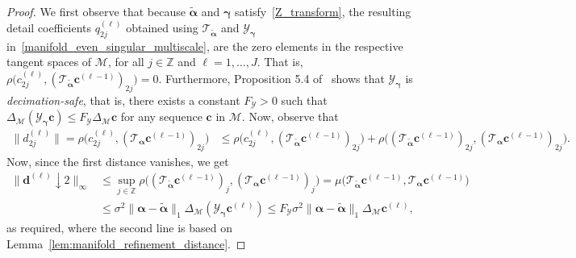 \documentclass[12pt]{article}
\begin{document}
\begin{proof}
    We first observe that because $\widetilde{\boldsymbol{\alpha}}$ and $\boldsymbol{\gamma}$ satisfy~\eqref{Z_transform}, the resulting detail coefficients $q^{(\ell)}_{2j}$ obtained using $\mathcal{T}_{\widetilde{\boldsymbol{\alpha}}}$ and $\mathcal{Y}_{\boldsymbol{\gamma}}$ in~\eqref{manifold_even_singular_multiscale}, are the zero elements in the respective tangent spaces of $\mathcal{M}$, for all $j\in\mathbb{Z}$ and $\ell=1,\dots,J$. That is, $\rho\big(c^{(\ell)}_{2j}, (\mathcal{T}_{\widetilde{\boldsymbol{\alpha}}}\boldsymbol{c}^{(\ell-1)})_{2j}\big)=0$. Furthermore, Proposition 5.4 of~\cite{mattar2023pyramid} shows that $\mathcal{Y}_{\boldsymbol{\gamma}}$ is \emph{decimation-safe}, that is, there exists a constant $F_{\mathcal{Y}}>0$ such that $\Delta_{\mathcal{M}}(\mathcal{Y}_{\boldsymbol{\gamma}}\boldsymbol{c})\leq F_{\mathcal{Y}}\Delta_{\mathcal{M}}\boldsymbol{c}$ for any sequence $\boldsymbol{c}$ in $\mathcal{M}$. Now, observe that
    \begin{align*}
        \|d^{(\ell)}_{2j}\| = \rho\big(c^{(\ell)}_{2j}, (\mathcal{T}_{\boldsymbol{\alpha}}\boldsymbol{c}^{(\ell-1)})_{2j}\big) & \leq \rho\big(c^{(\ell)}_{2j}, (\mathcal{T}_{\widetilde{\boldsymbol{\alpha}}}\boldsymbol{c}^{(\ell-1)})_{2j}\big) + \rho\big((\mathcal{T}_{\widetilde{\boldsymbol{\alpha}}}\boldsymbol{c}^{(\ell-1)})_{2j}, (\mathcal{T}_{\boldsymbol{\alpha}}\boldsymbol{c}^{(\ell-1)})_{2j}\big).
    \end{align*}
    Now, since the first distance vanishes, we get
    \begin{align*}
        \|\boldsymbol{d}^{(\ell)}\downarrow2\|_\infty &\leq \sup_{j\in\mathbb{Z}}\rho\big((\mathcal{T}_{\widetilde{\boldsymbol{\alpha}}}\boldsymbol{c}^{(\ell-1)})_{j}, (\mathcal{T}_{\boldsymbol{\alpha}}\boldsymbol{c}^{(\ell-1)})_{j}\big) = \mu\big(\mathcal{T}_{\widetilde{\boldsymbol{\alpha}}}\boldsymbol{c}^{(\ell-1)}, \mathcal{T}_{\boldsymbol{\alpha}}\boldsymbol{c}^{(\ell-1)}\big) \\
        & \leq \sigma^2\|\boldsymbol{\alpha} - \widetilde{\boldsymbol{\alpha}}\|_1\Delta_{\mathcal{M}}(\mathcal{Y}_{\boldsymbol{\gamma}}\boldsymbol{c}^{(\ell)}) \leq F_{\mathcal{Y}} \sigma^2\|\boldsymbol{\alpha} - \widetilde{\boldsymbol{\alpha}}\|_1\Delta_{\mathcal{M}}\boldsymbol{c}^{(\ell)},
    \end{align*}
    as required, where the second line is based on Lemma~\ref{lem:manifold_refinement_distance}.
\end{proof}
\end{document}
